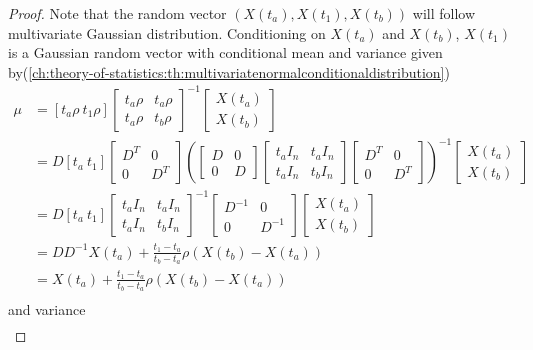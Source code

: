 \begin{refsection}
\begin{proof}
	Note that the random vector $(X(t_a), X(t_1),X(t_b))$ will follow multivariate Gaussian distribution. Conditioning on $X(t_a)$ and $X(t_b)$, $X(t_1)$ is a Gaussian random vector with conditional mean and variance given by(\autoref{ch:theory-of-statistics:th:multivariatenormalconditionaldistribution}) 
	\begin{align*}
	\mu&=[t_a \rho ~ t_1 \rho]\begin{bmatrix}
	t_a\rho & t_a\rho\\
	t_a\rho & t_b\rho
	\end{bmatrix}^{-1}\begin{bmatrix}
	X(t_a)\\
	X(t_b)
	\end{bmatrix} \\
	&= D [t_a  ~ t_1 ]\begin{bmatrix}
	D^T & 0\\
	0 & D^T
	\end{bmatrix}(\begin{bmatrix}
	D & 0\\
	0 & D
	\end{bmatrix}\begin{bmatrix}
	t_aI_n & t_aI_n\\
	t_aI_n & t_bI_n
	\end{bmatrix}\begin{bmatrix}
	D^T & 0\\
	0 & D^T
	\end{bmatrix})^{-1}\begin{bmatrix}
	X(t_a)\\
	X(t_b)
	\end{bmatrix} \\
	&= D [t_a  ~ t_1 ]\begin{bmatrix}
	t_aI_n & t_aI_n\\
	t_aI_n & t_bI_n
	\end{bmatrix}^{-1}\begin{bmatrix}
	D^{-1} & 0\\
	0 & D^{-1}
	\end{bmatrix}\begin{bmatrix}
	X(t_a)\\
	X(t_b)
	\end{bmatrix} \\
	&= DD^{-1}X(t_a) + \frac{t_1-t_a}{t_b-t_a}\rho(X(t_b)-X(t_a))\\
	&= X(t_a) + \frac{t_1-t_a}{t_b-t_a}\rho(X(t_b)-X(t_a))\\
	\end{align*}
	and
	variance
	\begin{align*}

\end{align*}
\end{proof}
\end{refsection}
